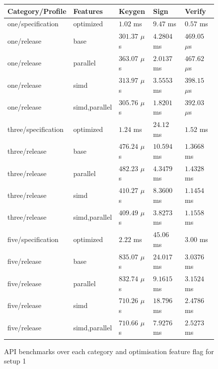 \documentclass[twoside,11pt]{report}
\theoremstyle{definition}
\theoremstyle{plain}
\begin{document}
\begin{figure}
  \centering
  \begin{tabular}{lllll}
    \hline
    Category/Profile    & Features      & Keygen          & Sign        & Verify          \\
    \hline
    one/specification   & optimized     & $1.02$ ms       & $9.47$ ms   & $0.57$ ms       \\
    one/release         & base          & $301.37$ $\mu$s & $4.2804$ ms & $469.05$ $\mu$s \\
    one/release         & parallel      & $363.07$ $\mu$s & $2.0137$ ms & $467.62$ $\mu$s \\
    one/release         & simd          & $313.97$ $\mu$s & $3.5553$ ms & $398.15$ $\mu$s \\
    one/release         & simd,parallel & $305.76$ $\mu$s & $1.8201$ ms & $392.03$ $\mu$s \\
    three/specification & optimized     & $1.24$ ms       & $24.12$ ms  & $1.52$ ms       \\
    three/release       & base          & $476.24$ $\mu$s & $10.594$ ms & $1.3668$ ms     \\
    three/release       & parallel      & $482.23$ $\mu$s & $4.3479$ ms & $1.4328$ ms     \\
    three/release       & simd          & $410.27$ $\mu$s & $8.3600$ ms & $1.1454$ ms     \\
    three/release       & simd,parallel & $409.49$ $\mu$s & $3.8273$ ms & $1.1558$ ms     \\
    five/specification  & optimized     & $2.22$ ms       & $45.06$ ms  & $3.00$ ms       \\
    five/release        & base          & $835.07$ $\mu$s & $24.017$ ms & $3.0376$ ms     \\
    five/release        & parallel      & $832.74$ $\mu$s & $9.1615$ ms & $3.1524$ ms     \\
    five/release        & simd          & $710.26$ $\mu$s & $18.796$ ms & $2.4786$ ms     \\
    five/release        & simd,parallel & $710.66$ $\mu$s & $7.9276$ ms & $2.5273$ ms     \\
    \hline
  \end{tabular}
  \caption{API benchmarks over each category and optimisation feature flag for setup 1}\label{fig:api_benchmarks_dell}
\end{figure}
\end{document}
